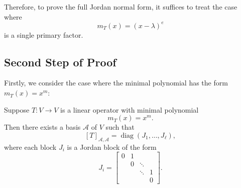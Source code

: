 \medskip

Therefore, to prove the full Jordan normal form, it suffices to treat the case where
\[
m_T(x) = (x - \lambda)^e
\]
is a single primary factor.

\subsection{Second Step of Proof}
Firstly, we consider the case where the minimal polynomial has the form \(m_T(x) = x^m\):
\begin{proposition}\label{prop:jordan-nilpotent}
Suppose \( T : V \to V \) is a linear operator with minimal polynomial
\[
m_T(x) = x^m.
\]
Then there exists a basis \( \mathcal{A} \) of \( V \) such that
\[
[T]_{\mathcal{A},\mathcal{A}} = \operatorname{diag}(J_1, \ldots, J_\ell),
\]
where each block \( J_i \) is a Jordan block of the form
\[
J_i = \begin{bmatrix}
0 & 1 &        &        \\
  & 0 & \ddots &        \\
  &   & \ddots & 1      \\
  &   &        & 0
\end{bmatrix}.
\]
\end{proposition}

